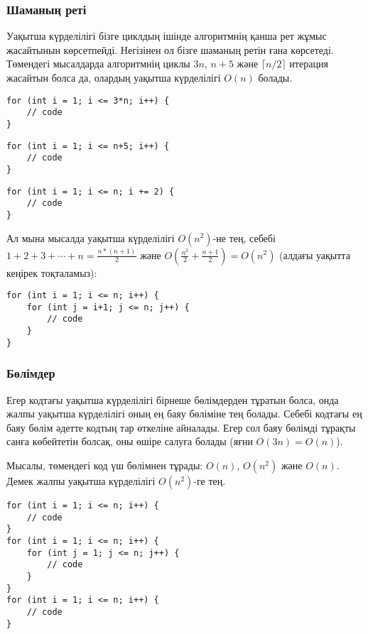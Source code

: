 \subsubsection*{Шаманың реті}

Уақытша күрделілігі бізге циклдың ішінде алгоритмнің
қанша рет жұмыс жасайтынын көрсетпейді. Негізінен ол бізге
шаманың ретін ғана көрсетеді.
Төмендегі мысалдарда алгоритмнің циклы $3n$, $n+5$
және $\lceil n/2 \rceil$ итерация жасайтын болса да, 
олардың уақытша күрделілігі $O(n)$ болады.


\begin{lstlisting}
for (int i = 1; i <= 3*n; i++) {
    // code
}
\end{lstlisting}

\begin{lstlisting}
for (int i = 1; i <= n+5; i++) {
    // code
}
\end{lstlisting}

\begin{lstlisting}
for (int i = 1; i <= n; i += 2) {
    // code
}
\end{lstlisting}


Ал мына мысалда уақытша күрделілігі $O(n^2)$-не тең, себебі $1 + 2 + 3 + \cdots + n = \frac{n*(n+1)}{2}$ және $O(\frac{n^2}{2}+\frac{n+1}{2}) = O(n^2)$ (алдағы уақытта кеңірек тоқталамыз):

\begin{lstlisting}
for (int i = 1; i <= n; i++) {
    for (int j = i+1; j <= n; j++) {
        // code
    }
}
\end{lstlisting}



\subsubsection*{Бөлімдер}

Егер кодтағы уақытша күрделілігі бірнеше бөлімдерден тұратын болса,
онда жалпы уақытша күрделілігі оның ең баяу бөліміне тең болады. 
Себебі кодтағы ең баяу бөлім әдетте 
кодтың тар өткеліне айналады. Егер сол баяу бөлімді 
тұрақты санға көбейтетін болсақ, оны өшіре салуға болады 
(яғни $O(3n)=O(n)$).


Мысалы, төмендегі код үш бөлімнен тұрады: 
$O(n)$, $O(n^2)$ және $O(n)$.
Демек жалпы уақытша күрделілігі $O(n^2)$-ге тең.

\begin{lstlisting}
for (int i = 1; i <= n; i++) {
    // code
}
for (int i = 1; i <= n; i++) {
    for (int j = 1; j <= n; j++) {
        // code
    }
}
for (int i = 1; i <= n; i++) {
    // code
}
\end{lstlisting}


